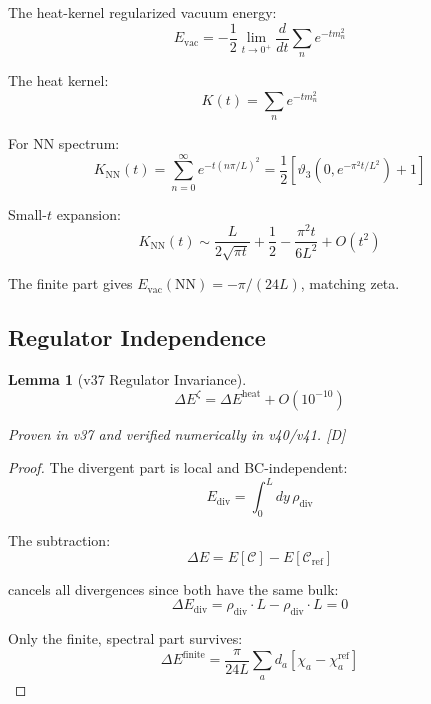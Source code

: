 \documentclass[11pt,a4paper]{article}
\newtheorem{lemma}[theorem]{Lemma}
\newcommand{\tagD}{\textcolor{blue!70!black}{[D]}}
\begin{document}
The heat-kernel regularized vacuum energy:
\begin{equation}
\label{eq:heat-kernel-def}
E_{\text{vac}} = -\frac{1}{2} \lim_{t \to 0^+} \frac{d}{dt} \sum_n e^{-t m_n^2}
\end{equation}

The heat kernel:
\begin{equation}
\label{eq:heat-kernel-sum}
K(t) = \sum_n e^{-t m_n^2}
\end{equation}

For NN spectrum:
\begin{equation}
\label{eq:heat-NN}
K_{\text{NN}}(t) = \sum_{n=0}^\infty e^{-t (n\pi/L)^2} = \frac{1}{2} \left[\vartheta_3(0, e^{-\pi^2 t/L^2}) + 1\right]
\end{equation}

Small-$t$ expansion:
\begin{equation}
\label{eq:heat-small-t}
K_{\text{NN}}(t) \sim \frac{L}{2\sqrt{\pi t}} + \frac{1}{2} - \frac{\pi^2 t}{6L^2} + O(t^2)
\end{equation}

The finite part gives $E_{\text{vac}}(\text{NN}) = -\pi/(24L)$, matching zeta.

\subsection{Regulator Independence}

\begin{lemma}[v37 Regulator Invariance]
\label{lem:v37-inv}
\begin{equation}
\label{eq:reg-inv}
\Delta E^{\zeta} = \Delta E^{\text{heat}} + O(10^{-10})
\end{equation}

Proven in v37 and verified numerically in v40/v41.
\tagD
\end{lemma}

\begin{proof}
The divergent part is local and BC-independent:
\begin{equation}
\label{eq:div-local}
E_{\text{div}} = \int_0^L dy\, \rho_{\text{div}}
\end{equation}

The subtraction:
\begin{equation}
\label{eq:subtraction}
\Delta E = E[\mathcal{C}] - E[\mathcal{C}_{\text{ref}}]
\end{equation}

cancels all divergences since both have the same bulk:
\begin{equation}
\label{eq:div-cancel}
\Delta E_{\text{div}} = \rho_{\text{div}} \cdot L - \rho_{\text{div}} \cdot L = 0
\end{equation}

Only the finite, spectral part survives:
\begin{equation}
\label{eq:finite-spectral}
\Delta E^{\text{finite}} = \frac{\pi}{24L} \sum_a d_a [\chi_a - \chi_a^{\text{ref}}]
\end{equation}
\end{proof}
\end{document}
